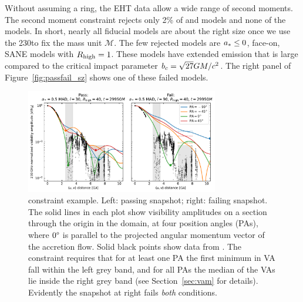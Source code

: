 Without assuming a ring, the EHT data allow a wide range of second moments.  The second moment constraint rejects only 2\% of \kharma and \bhac models and none of the \hamr models.  In short, nearly all fiducial models are about the right size once we use the 230\GHz to fix the mass unit $\mathcal{M}$.  The few rejected models are $a_* \le 0$, face-on, SANE models with $R_\mathrm{high} = 1$.  These models have extended emission that is large compared to the critical impact parameter $b_c = \sqrt{27} GM/c^2$.  The right panel of Figure~\ref{fig:passfail_sz} shows one of these failed models.

\label{sec:vam}

\begin{figure}
  \centering
  \includegraphics[width=0.75\textwidth]{figures/passfail_va.pdf}
  \caption{\vam constraint example.  Left: passing snapshot; right: failing snapshot.  The solid lines in each plot show visibility amplitudes on a section through the origin in the \uv domain, at four position angles (PAs), where $0\degree$ is parallel to the projected angular momentum vector of the accretion flow.
  Solid black points show data from \aprilvii.  The \vam constraint requires that for at least one PA the first minimum in VA fall within the left grey band, and for all PAs the median of the VAs lie inside the right grey band (see Section~\ref{sec:vam} for details).  Evidently the snapshot at right fails {\em both} conditions.
  }
  \label{fig:passfail_va}
\end{figure}

